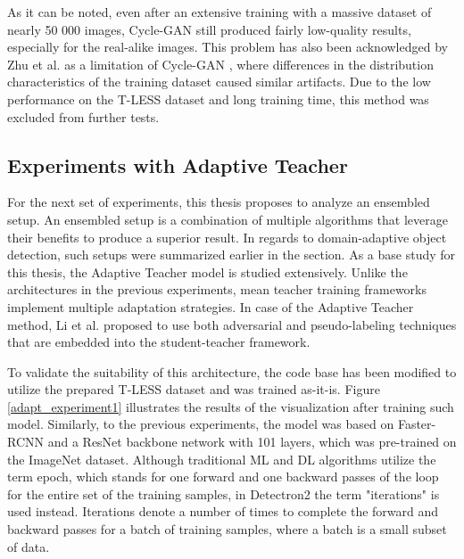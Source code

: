 As it can be noted, even after an extensive training with a massive dataset of nearly 50 000 images, Cycle-GAN still produced fairly low-quality results, especially for the real-alike images. This problem has also been acknowledged by Zhu et al. as a limitation of Cycle-GAN \cite{Zhu2017}, where differences in the distribution characteristics of the training dataset caused similar artifacts. Due to the low performance on the T-LESS dataset and long training time, this method was excluded from further tests. 

\FloatBarrier

\subsection{Experiments with Adaptive Teacher}
\label{ensemExp} 
For the next set of experiments, this thesis proposes to analyze an ensembled setup. An ensembled setup is a combination of multiple algorithms that leverage their benefits to produce a superior result. In regards to domain-adaptive object detection, such setups were summarized earlier in the  section. As a base study for this thesis, the Adaptive Teacher \cite{Li2021} model is studied extensively. Unlike the architectures in the previous experiments, mean teacher training frameworks implement multiple adaptation strategies. In case of the Adaptive Teacher method, Li et al. proposed to use both adversarial and pseudo-labeling techniques that are embedded into the student-teacher framework. 

To validate the suitability of this architecture, the code base has been modified to utilize the prepared T-LESS dataset and was trained as-it-is. Figure \ref{adapt_experiment1} illustrates the results of the visualization after training such model. Similarly, to the previous experiments, the model was based on Faster-RCNN \cite{ima} and a ResNet \cite{He2015} backbone network with 101 layers, which was pre-trained on the ImageNet  \cite{Russakovsky2014} dataset. Although traditional ML and DL algorithms utilize the term epoch, which stands for one forward and one backward passes of the loop for the entire set of the training samples, in Detectron2 \cite{wu2019Detectron2} the term "iterations" is used instead. Iterations denote a number of times to complete the forward and backward passes for a batch of training samples, where a batch is a small subset of data. 

